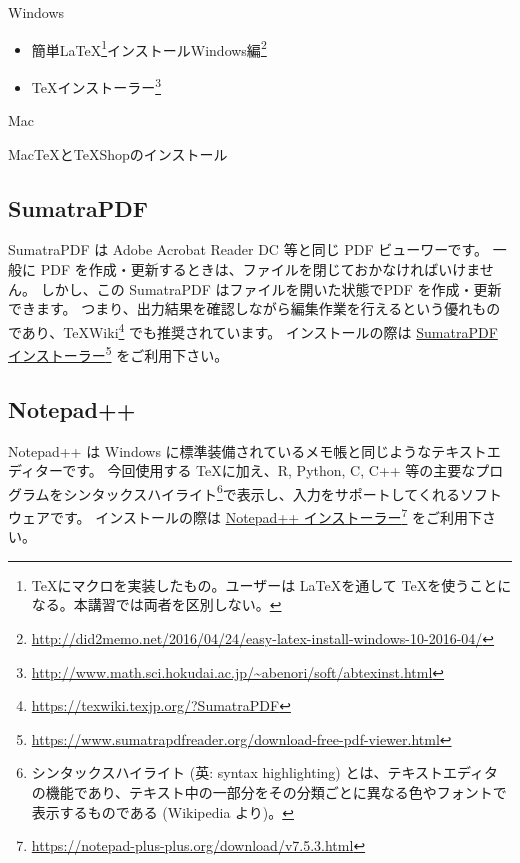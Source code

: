 \noindent Windows

\begin{itemize}
\item 簡単\LaTeX\footnote{\TeX にマクロを実装したもの。ユーザーは \LaTeX を通して \TeX を使うことになる。本講習では両者を区別しない。}インストールWindows編\footnote{\url{http://did2memo.net/2016/04/24/easy-latex-install-windows-10-2016-04/}}
\item \TeX インストーラー\footnote{\url{http://www.math.sci.hokudai.ac.jp/~abenori/soft/abtexinst.html}}
\end{itemize}



\noindent Mac

\item MacTeXとTeXShopのインストール



\subsection*{SumatraPDF}
SumatraPDF は Adobe Acrobat Reader DC 等と同じ PDF ビューワーです。
一般に PDF を作成・更新するときは、ファイルを閉じておかなければいけません。
しかし、この SumatraPDF はファイルを開いた状態でPDF を作成・更新できます。
つまり、出力結果を確認しながら編集作業を行えるという優れものであり、\TeX Wiki\footnote{\url{https://texwiki.texjp.org/?SumatraPDF}} でも推奨されています。
インストールの際は \href{https://www.sumatrapdfreader.org/download-free-pdf-viewer.html}{SumatraPDF インストーラー}\footnote{\url{https://www.sumatrapdfreader.org/download-free-pdf-viewer.html}} をご利用下さい。





\subsection*{Notepad++}
Notepad++ は Windows に標準装備されているメモ帳と同じようなテキストエディターです。
今回使用する \TeX に加え、R, Python, C, C++ 等の主要なプログラムをシンタックスハイライト\footnote{シンタックスハイライト (英: syntax highlighting) とは、テキストエディタの機能であり、テキスト中の一部分をその分類ごとに異なる色やフォントで表示するものである (Wikipedia より)。}で表示し、入力をサポートしてくれるソフトウェアです。
インストールの際は \href{https://notepad-plus-plus.org/download/v7.5.3.html}{Notepad++ インストーラー}\footnote{\url{https://notepad-plus-plus.org/download/v7.5.3.html}} をご利用下さい。






